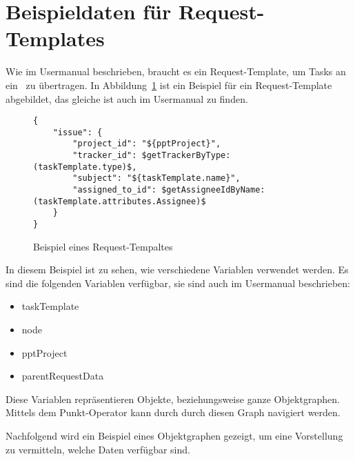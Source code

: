 

\section{Beispieldaten für Request-Templates}
\label{sec:ExampleProcessorData}
	Wie im Usermanual beschrieben, braucht es ein Request-Template, um Tasks an ein \ppt\ zu übertragen.
	In Abbildung~\ref{fig:exampleRequestTemplate} ist ein Beispiel für ein Request-Template abgebildet, das gleiche ist auch im Usermanual zu finden.
	
	\begin{figure}[H]
		\begin{lstlisting}
{
	"issue": {
		"project_id": "${pptProject}",
		"tracker_id": $getTrackerByType:(taskTemplate.type)$,
		"subject": "${taskTemplate.name}",
		"assigned_to_id": $getAssigneeIdByName:(taskTemplate.attributes.Assignee)$
	}
}

		\end{lstlisting}
		\centering
		\caption{Beispiel eines Request-Tempaltes}
		\label{fig:exampleRequestTemplate}
	\end{figure}	
	
	In diesem Beispiel ist zu sehen, wie verschiedene Variablen verwendet werden.
	Es sind die folgenden Variablen verfügbar, sie sind auch im Usermanual beschrieben:
	\begin{itemize}
		\item taskTemplate
		\item node
		\item pptProject
		\item parentRequestData
	\end{itemize}
	Diese Variablen repräsentieren Objekte, beziehungsweise ganze Objektgraphen.
	Mittels dem Punkt-Operator kann durch durch diesen Graph navigiert werden.
	
	Nachfolgend wird ein Beispiel eines Objektgraphen gezeigt,
	um eine Vorstellung zu vermitteln, welche Daten verfügbar sind.

	
